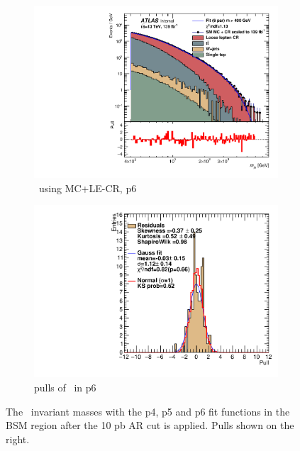 \begin{figure}[H]
\begin{subfigure}[h]{0.38\linewidth}
    \includegraphics[scale=0.3]{figs/ch6/fit/variable_nosmooth/p6/10PB/output_SMMCplusCR_Mje_p6.pdf}%
    \caption{\mje \ using MC+LE-CR, p6}
    \end{subfigure}
    \hfill
    \begin{subfigure}[h]{0.4\linewidth}
    \includegraphics[scale=0.32]{figs/ch6/fit/variable_nosmooth/p6/10PB/pull_SMMCplusCR_Mje_p6.pdf}%
    \caption{pulls of \mje \ in p6}
    \end{subfigure}
    \hfill
    \caption{The \mje \ invariant masses with the p4, p5 and p6 fit functions in the BSM region after the 10 pb AR cut is applied. Pulls shown on the right.}
\label{fig:mje-fit-pulls}
\end{figure}

